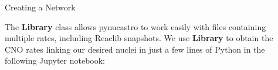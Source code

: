 \documentclass[final]{beamer}
\newlength{\sepwid}
\newlength{\onecolwid}
\newlength{\twocolwid}
\begin{document}
\begin{frame}[t]
\begin{columns}[t]
\begin{column}{\onecolwid}

\end{column} %

\begin{column}{\sepwid}\end{column} %

\begin{column}{\twocolwid} %

\begin{columns}[t,totalwidth=\twocolwid] %

\begin{column}{\onecolwid}\vspace{-.6in} %


\begin{block}{Creating a Network}

The \textbf{Library} class allows pynucastro to work easily with files
containing multiple rates, including Reaclib snapshots. We use
\textbf{Library} to obtain the CNO rates linking our desired nuclei in
just a few lines of Python in the following Jupyter notebook:


\end{block}
\end{column}
\end{columns}
\end{column}
\end{columns}
\end{frame}
\end{document}

